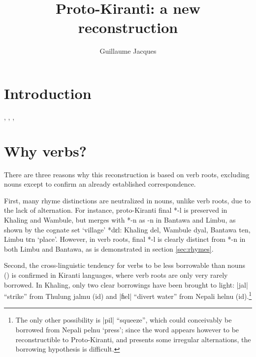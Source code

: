 \documentclass[oldfontcommands,oneside,a4paper,11pt]{article}
\newcommand{\ipa}[1]{{\phon\mbox{#1}}} %
\newcommand{\dhatu}[2]{|\ipa{#1}| ``#2''}
\begin{document}
\title{Proto-Kiranti: a new reconstruction}
\author{Guillaume Jacques}
\maketitle
\sloppy
\section{Introduction}
\citet{starostin94kiranti}, \citet{michailovsky94stops}, \citet{opgenort05jero}, \citet{michailovsky10kiranti}

\citet{opgenort04wambule}
\citet{doornenbal09}
\citet{michailovsky02dico}
\citet{jacques15khaling}
\citet{jacques12khaling}
 
\section{Why verbs?}

There are three reasons why this reconstruction is based on verb roots, excluding nouns except to confirm an already established correspondence.

First,  many rhyme distinctions are neutralized in nouns, unlike verb roots, due to the lack of alternation. For instance, proto-Kiranti final *\ipa{-l} is preserved in Khaling and Wambule, but merges with *\ipa{-n} as \ipa{-n} in Bantawa and Limbu, as shown by the cognate set `village' *\ipa{dɛl}: Khaling \ipa{del}, Wambule \ipa{dyal}, Bantawa \ipa{ten}, Limbu \ipa{tɛn} `place'. However, in verb roots, final *\ipa{-l} is clearly distinct from *\ipa{-n} in both Limbu and Bantawa, as is demonstrated in section \ref{sec:rhymes}.

Second, the cross-linguistic tendency for verbs to be less borrowable than nouns (\citealt{wohlgemuth09verbal}) is confirmed in Kiranti languages, where verb roots are only very rarely borrowed. In Khaling, only two clear borrowings have been brought to light: \dhatu{jal}{strike} from Thulung \ipa{jalmu}  (id) and \dhatu{ɦel}{divert water} from Nepali \ipa{helnu} (id).\footnote{The only other possibility is  \dhatu{pil}{squeeze}, which could conceivably be borrowed from Nepali \ipa{pelnu} `press'; since the word appears however to be reconstructible to Proto-Kiranti, and presents some irregular alternations, the borrowing hypothesis is difficult.} 
\end{document}
